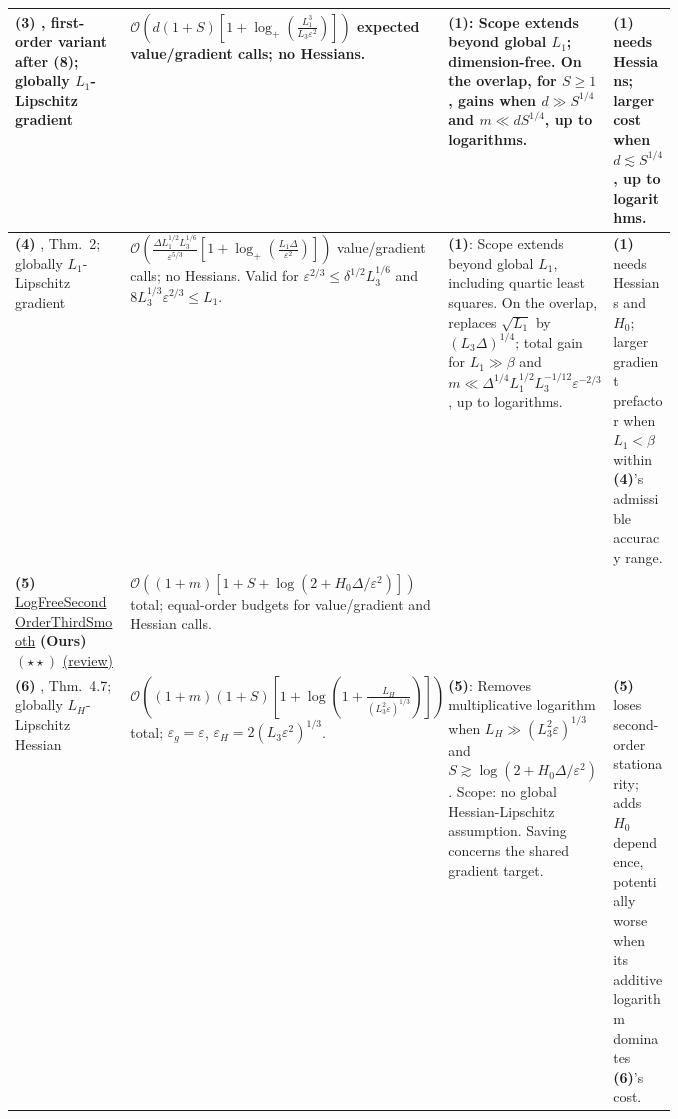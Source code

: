 \begin{table}[tp]
\begin{threeparttable}
\begin{tabularx}{\linewidth}{@{}>{\raggedright\arraybackslash}p{0.20\linewidth}>{\raggedright\arraybackslash}p{0.32\linewidth}>{\raggedright\arraybackslash}p{0.25\linewidth}>{\raggedright\arraybackslash}X@{}}
\midrule
\textbf{(3)} \citep{tdsHinder2018v2}, first-order variant after (8); globally $L_1$-Lipschitz gradient
& $\mathcal{O}\!\left(d(1+S)\left[1+\log_+\!\left(\frac{L_1^3}{L_3\varepsilon^2}\right)\right]\right)$ expected value/gradient calls; no Hessians.
& \textbf{(1)}: Scope extends beyond global $L_1$; dimension-free. On the overlap, for $S\ge1$, gains when $d\gg S^{1/4}$ and $m\ll dS^{1/4}$, up to logarithms.
& \textbf{(1)} needs Hessians; larger cost when $d\lesssim S^{1/4}$, up to logarithms. \\
\midrule
\textbf{(4)} \citep{tdsCarmonEtAl2017}, Thm.~2; globally $L_1$-Lipschitz gradient
& $\mathcal{O}\!\left(\frac{\Delta L_1^{1/2}L_3^{1/6}}{\varepsilon^{5/3}}\left[1+\log_+\!\left(\frac{L_1\Delta}{\varepsilon^2}\right)\right]\right)$ value/gradient calls; no Hessians.
\newline Valid for $\varepsilon^{2/3}\le\delta^{1/2}L_3^{1/6}$ and $8L_3^{1/3}\varepsilon^{2/3}\le L_1$.
& \textbf{(1)}: Scope extends beyond global $L_1$, including quartic least squares. On the overlap, replaces $\sqrt{L_1}$ by $(L_3\Delta)^{1/4}$; total gain for $L_1\gg\beta$ and $m\ll\Delta^{1/4}L_1^{1/2}L_3^{-1/12}\varepsilon^{-2/3}$, up to logarithms.
& \textbf{(1)} needs Hessians and $H_0$; larger gradient prefactor when $L_1<\beta$ within \textbf{(4)}'s admissible accuracy range. \\
\midrule
\textbf{(5)} \href{https://github.com/k3nfalt/longtails/blob/main/LongTails/Theorems/LogFreeSecondOrderThirdSmooth.lean}{Log\allowbreak Free\allowbreak Second\allowbreak Order\allowbreak Third\allowbreak Smooth} \textbf{(Ours)} $(\star\star)$ \href{https://github.com/k3nfalt/longtails/blob/main/scripts/reviews/LogFreeSecondOrderThirdSmooth.md}{(review)}
& $\mathcal{O}\!\left((1+m)\left[1+S+\log(2+H_0\Delta/\varepsilon^2)\right]\right)$ total; equal-order budgets for value/gradient and Hessian calls.
& & \\
\midrule
\textbf{(6)} \citep{tdsHeZhang2026v1}, Thm.~4.7; globally $L_H$-Lipschitz Hessian
& $\mathcal{O}\!\left((1+m)(1+S)\left[1+\log\!\left(1+\frac{L_H}{(L_3^2\varepsilon)^{1/3}}\right)\right]\right)$ total; $\varepsilon_g=\varepsilon$, $\varepsilon_H=2(L_3\varepsilon^2)^{1/3}$.
& \textbf{(5)}: Removes multiplicative logarithm when $L_H\gg(L_3^2\varepsilon)^{1/3}$ and $S\gtrsim\log(2+H_0\Delta/\varepsilon^2)$. Scope: no global Hessian-Lipschitz assumption. Saving concerns the shared gradient target.
& \textbf{(5)} loses second-order stationarity; adds $H_0$ dependence, potentially worse when its additive logarithm dominates \textbf{(6)}'s cost. \\

\end{tabularx}
\end{threeparttable}
\end{table}
